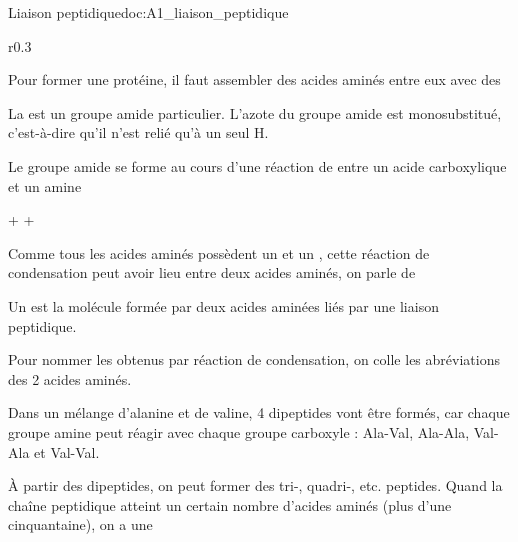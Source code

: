 \begin{doc}{Liaison peptidique}{doc:A1_liaison_peptidique}
  \begin{wrapfigure}[3]{r}{0.3\linewidth}
    \centering

  \end{wrapfigure}
  
  Pour former une protéine, il faut assembler des acides aminés entre eux avec des 

  \begin{importants}
    La  est un groupe amide particulier.
    L'azote du groupe amide est monosubstitué, c'est-à-dire qu'il n'est relié qu'à un seul H.
  \end{importants}

  Le groupe amide se forme au cours d'une réaction de  entre un acide carboxylique et un amine
  \vspace*{-4pt}
  
  \begin{center}
     +   
    \reaction
     +
    \eau
  \end{center}
  \vspace*{-4pt}

  Comme tous les acides aminés possèdent un  et un , cette réaction de condensation peut avoir lieu entre deux acides aminés, on parle de 

  \begin{importants}
    Un  est la molécule formée par deux acides aminées liés par une liaison peptidique.
    
    Pour nommer les  obtenus par réaction de condensation, on colle les abréviations des 2 acides aminés.
  \end{importants}

  Dans un mélange  d'alanine et de valine, 4 dipeptides vont être formés, car chaque groupe amine peut réagir avec chaque groupe carboxyle :
  Ala-Val, Ala-Ala, Val-Ala et Val-Val.

  \begin{importants}  
    À partir des dipeptides, on peut former des tri-, quadri-, etc. peptides.
    Quand la chaîne peptidique atteint un certain nombre d'acides aminés (plus d'une cinquantaine), on a une 
  \end{importants}
\end{doc}

